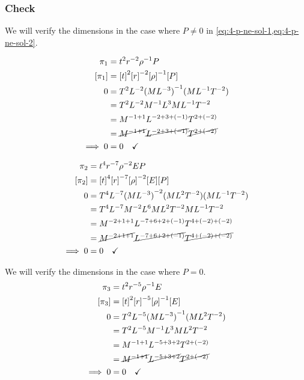 \documentclass[12pt]{article}
\begin{document}
  \subsubsection*{Check}
  We will verify the dimensions in the case where $P\ne0$ in
  \cref{eq:4-p-ne-sol-1,eq:4-p-ne-sol-2}.

  \begin{equation}
    \begin{aligned}
      \pi_1 &= t^2r^{-2}\rho^{-1}P \\
      [\pi_1] &= {[t]}^2{[r]}^{-2}{[\rho]}^{-1}[P] \\
      0 &= T^2L^{-2}{(ML^{-3})}^{-1}(ML^{-1}T^{-2}) \\
      &= T^2L^{-2}M^{-1}L^{3}ML^{-1}T^{-2} \\
      &= M^{-1+1}L^{-2+3+(-1)}T^{2+(-2)} \\
      &= \cancel{M^{-1+1}}\cancel{L^{-2+3+(-1)}}\cancel{T^{2+(-2)}} \\
      \implies 0 &= 0 \quad\checkmark \\
    \end{aligned}
  \end{equation}

  \begin{equation}
    \begin{aligned}
      \pi_2 &= t^4r^{-7}\rho^{-2}EP \\
      [\pi_2] &= {[t]}^4{[r]}^{-7}{[\rho]}^{-2}[E][P] \\
      0 &= T^4L^{-7}{(ML^{-3})}^{-2}(ML^2T^{-2})(ML^{-1}T^{-2}) \\
      &= T^4L^{-7}M^{-2}L^{6}ML^2T^{-2}ML^{-1}T^{-2} \\
      &= M^{-2+1+1}L^{-7+6+2+(-1)}T^{4+(-2)+(-2)} \\
      &= \cancel{M^{-2+1+1}}\cancel{L^{-7+6+2+(-1)}}\cancel{T^{4+(-2)+(-2)}} \\
      \implies 0 &= 0 \quad\checkmark \\
    \end{aligned}
  \end{equation}

  We will verify the dimensions in the case where $P=0$.
  \begin{equation}
    \begin{aligned}
      \pi_3 &= t^{2} r^{-5} \rho^{-1} E  \\
      [\pi_3] &= {[t]}^{2} {[r]}^{-5} {[\rho]}^{-1} [E] \\
      0 &= T^2 L^{-5} {(ML^{-3})}^{-1} (ML^2T^{-2}) \\
      &= T^2 L^{-5} M^{-1}L^{3} ML^2T^{-2} \\
      &= M^{-1+1} L^{-5+3+2} T^{2+(-2)} \\
      &= \cancel{M^{-1+1}} \cancel{L^{-5+3+2}} \cancel{T^{2+(-2)}} \\
      \implies 0 &= 0 \quad\checkmark \\
    \end{aligned}
  \end{equation}
\end{document}
